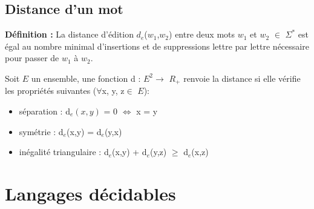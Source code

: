 \documentclass{article}
\begin{document}
\subsection{Distance d'un mot}
\textbf{Définition :}\newline
La distance d'édition $d_{e}$($w_{1}$,$w_{2}$) entre deux mots $w_{1}$ et $w_{2}$ $\in$ $\Sigma^{*}$ est égal au nombre minimal d'insertions et de suppressions lettre par lettre nécessaire pour passer de $w_{1}$ à $w_{2}$.

Soit $E$ un ensemble, une fonction d : $E^{2} \rightarrow$ $R_{+}$ renvoie la distance si elle vérifie les propriétés suivantes ($\forall$x, y, z$\in$ $E$):
\begin{itemize}
    \item séparation : d$_{e}(x,y)$ = 0 $\Longleftrightarrow$ x = y
    \item symétrie : d$_{e}$(x,y) = d$_{e}$(y,x)
    \item inégalité triangulaire : d$_{e}$(x,y) + d$_{e}$(y,z) $\geq$ d$_{e}$(x,z)
\end{itemize}
\newpage














\section{Langages décidables}
\end{document}
